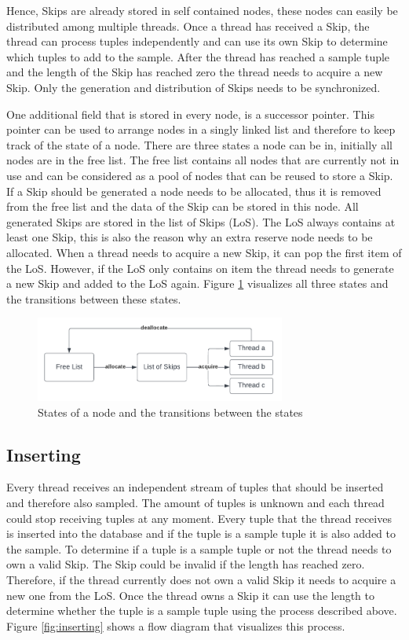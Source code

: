 \documentclass[sigconf,nonacm]{acmart}
\begin{document}
        Hence, Skips are already stored in self contained nodes, these nodes can easily be distributed among multiple threads. Once a thread has received a Skip, the thread can process tuples independently and can use its own Skip to determine which tuples to add to the sample. After the thread has reached a sample tuple and the length of the Skip has reached zero the thread needs to acquire a new Skip. Only the generation and distribution of Skips needs to be synchronized.

        One additional field that is stored in every node, is a successor pointer. This pointer can be used to arrange nodes in a singly linked list and therefore to keep track of the state of a node. There are three states a node can be in, initially all nodes are in the free list. The free list contains all nodes that are currently not in use and can be considered as a pool of nodes that can be reused to store a Skip. If a Skip should be generated a node needs to be allocated, thus it is removed from the free list and the data of the Skip can be stored in this node. All generated Skips are stored in the list of Skips (LoS). The LoS always contains at least one Skip, this is also the reason why an extra reserve node needs to be allocated. When a thread needs to acquire a new Skip, it can pop the first item of the LoS. However, if the LoS only contains on item the thread needs to generate a new Skip and added to the LoS again. Figure \ref{fig:lifecycle} visualizes all three states and the transitions between these states.
        \begin{figure}[H]
            \includegraphics[height=2.8cm]{figure2.pdf}
            \caption{States of a node and the transitions between the states}
            \label{fig:lifecycle}
        \end{figure}

    \subsection{Inserting}
        Every thread receives an independent stream of tuples that should be inserted and therefore also sampled. The amount of tuples is unknown and each thread could stop receiving tuples at any moment. Every tuple  that the thread receives is inserted into the database and if the tuple is a sample tuple it is also added to the sample. To determine if a tuple is a sample tuple or not the thread needs to own a valid Skip. The Skip could be invalid if the length has reached zero. Therefore, if the thread currently does not own a valid Skip it needs to acquire a new one from the LoS. Once the thread owns a Skip it can use the length to determine whether the tuple is a sample tuple using the process described above. Figure \ref{fig:inserting} shows a flow diagram that visualizes this process.
\end{document}
